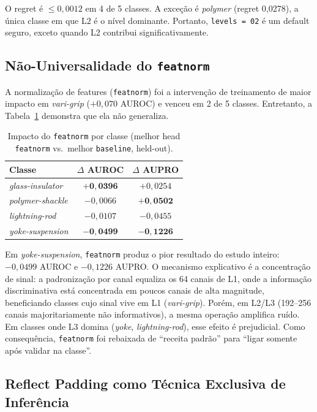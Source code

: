 \documentclass[conference]{IEEEtran}
\begin{document}
O regret é $\leq 0{,}0012$ em 4 de 5 classes. A exceção é \textit{polymer} (regret 0{,}0278), a única classe em que L2 é o nível dominante. Portanto, \texttt{levels\,=\,02} é um default seguro, exceto quando L2 contribui significativamente.

\subsection{Não-Universalidade do \texttt{featnorm}}
\label{sec:featnorm}

A normalização de features (\texttt{featnorm}) foi a intervenção de treinamento de maior impacto em \textit{vari-grip} ($+0{,}070$ AUROC) e venceu em 2 de 5 classes. Entretanto, a Tabela~\ref{tab:featnorm} demonstra que ela não generaliza.

\begin{table}[htb]
\centering
\caption{Impacto do \texttt{featnorm} por classe (melhor head \texttt{featnorm} vs.\ melhor \texttt{baseline}, held-out).}
\label{tab:featnorm}
\begin{tabular}{@{}lcc@{}}
\toprule
Classe & $\Delta$ AUROC & $\Delta$ AUPRO \\
\midrule
\textit{glass-insulator}  & $\mathbf{+0{,}0396}$ & $+0{,}0254$ \\
\textit{polymer-shackle}  & $-0{,}0066$ & $\mathbf{+0{,}0502}$ \\
\textit{lightning-rod}    & $-0{,}0107$ & $-0{,}0455$ \\
\textit{yoke-suspension}  & $\mathbf{-0{,}0499}$ & $\mathbf{-0{,}1226}$ \\
\bottomrule
\end{tabular}
\end{table}

Em \textit{yoke-suspension}, \texttt{featnorm} produz o pior resultado do estudo inteiro: $-0{,}0499$ AUROC e $-0{,}1226$ AUPRO. O mecanismo explicativo é a concentração de sinal: a padronização por canal equaliza os 64 canais de L1, onde a informação discriminativa está concentrada em poucos canais de alta magnitude, beneficiando classes cujo sinal vive em L1 (\textit{vari-grip}). Porém, em L2/L3 (192--256 canais majoritariamente não informativos), a mesma operação amplifica ruído. Em classes onde L3 domina (\textit{yoke}, \textit{lightning-rod}), esse efeito é prejudicial. Como consequência, \texttt{featnorm} foi rebaixada de ``receita padrão'' para ``ligar somente após validar na classe''.

\subsection{Reflect Padding como Técnica Exclusiva de Inferência}
\label{sec:pad}
\end{document}
